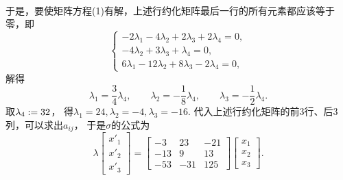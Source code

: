 \begin{example}
\begin{solution}
\begin{align*}
\end{align*}
于是，要使矩阵方程(1)有解，上述行约化矩阵最后一行的所有元素都应该等于零，即\begin{equation*}
	\begin{cases}
		-2 \lambda_1 - 4 \lambda_2 + 2 \lambda_3 + 2 \lambda_4
		= 0, \\
		-4 \lambda_2 + 3 \lambda_3 + \lambda_4
		= 0, \\
		6 \lambda_1 - 12 \lambda_2 + 8 \lambda_3 - 2 \lambda_4
		= 0,
	\end{cases}
\end{equation*}
解得\begin{equation*}
	\lambda_1
	= \frac34 \lambda_4,
	\qquad
	\lambda_2
	= -\frac18 \lambda_4,
	\qquad
	\lambda_3
	= -\frac12 \lambda_4.
\end{equation*}
取\(\lambda_4 := 32\)，
得\(
	\lambda_1 = 24,
	\lambda_2 = -4,
	\lambda_3 = -16
\).
代入上述行约化矩阵的前3行、后3列，可以求出\(a_{ij}\)，
于是\(\sigma\)的公式为\begin{equation*}
	\lambda
	\begin{bmatrix}
		x'_1 \\ x'_2 \\ x'_3
	\end{bmatrix}
	= \begin{bmatrix}
		-3 & 23 & -21 \\
		-13 & 9 & 13 \\
		-53 & -31 & 125
	\end{bmatrix}
	\begin{bmatrix}
		x_1 \\ x_2 \\ x_3
	\end{bmatrix}.
\end{equation*}
\end{solution}
\end{example}
